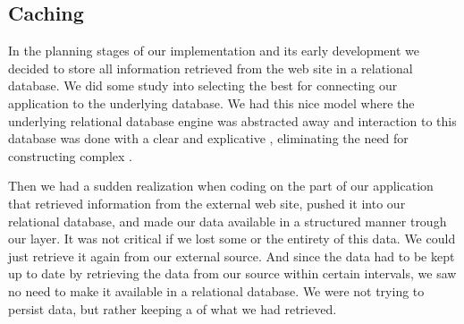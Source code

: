 \subsection{Caching}
\label{section:implementation.architecture.caching}

In the planning stages of our implementation and its early development we
decided to store all information retrieved from the \urort{} web site
in a relational database. We did some study into selecting the best
%
for connecting our application to the underlying database. We had this nice
model where the underlying relational database engine was abstracted away
and interaction to this database was done with a clear and explicative
%
,
eliminating the need for constructing complex %
.

Then we had a sudden realization when coding on the part of our application
that retrieved information from the external \urort{} web site, pushed it into
our relational database, and made our data available in a structured manner
trough our  layer. It was not critical if we lost some or the
entirety of this data. We could just retrieve it again from our external
source. And since the data had to be kept up to date by retrieving the data
from our source within certain intervals, we saw no need to make it available
in a relational database. We were not trying to persist data, but rather
keeping a %
of what we had retrieved.

